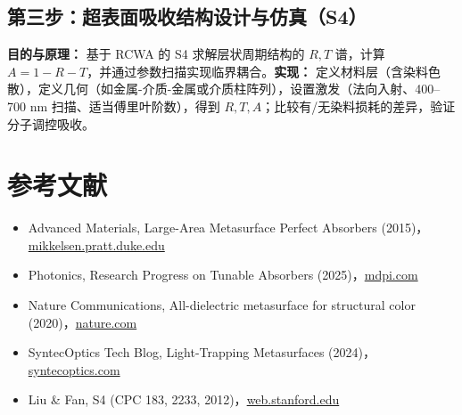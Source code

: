 \documentclass[11pt]{ctexart}
\begin{document}
\subsection{第三步：超表面吸收结构设计与仿真（S4）}
\textbf{目的与原理：} 基于 RCWA 的 S4 求解层状周期结构的 $R,T$ 谱，计算 $A=1-R-T$，并通过参数扫描实现临界耦合。\textbf{实现：} 定义材料层（含染料色散），定义几何（如金属-介质-金属或介质柱阵列），设置激发（法向入射、400–700 nm 扫描、适当傅里叶阶数），得到 $R,T,A$；比较有/无染料损耗的差异，验证分子调控吸收。

\section*{参考文献}
\begin{itemize}
  \item Advanced Materials, Large-Area Metasurface Perfect Absorbers (2015)，\url{mikkelsen.pratt.duke.edu}
  \item Photonics, Research Progress on Tunable Absorbers (2025)，\url{mdpi.com}
  \item Nature Communications, All-dielectric metasurface for structural color (2020)，\url{nature.com}
  \item SyntecOptics Tech Blog, Light-Trapping Metasurfaces (2024)，\url{syntecoptics.com}
  \item Liu \& Fan, S4 (CPC 183, 2233, 2012)，\url{web.stanford.edu}
\end{itemize}
\end{document}
